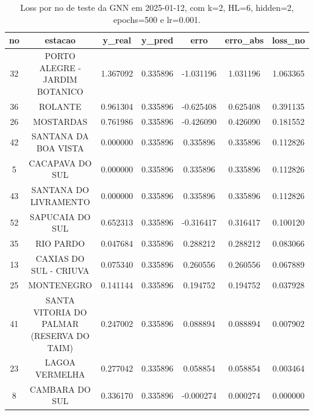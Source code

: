 \begin{table}[h]
\centering
\caption{Loss por no de teste da GNN em 2025-01-12, com k=2, HL=6, hidden=2, epochs=500 e lr=0.001.}
\label{tab:gnn_loss_k2_hl6_h2_e500_d20250112}
\begin{tabular}{ccccccc}
\toprule
no & estacao & y\_real & y\_pred & erro & erro\_abs & loss\_no \\
\midrule
32 & PORTO ALEGRE - JARDIM BOTANICO & 1.367092 & 0.335896 & -1.031196 & 1.031196 & 1.063365 \\
36 & ROLANTE & 0.961304 & 0.335896 & -0.625408 & 0.625408 & 0.391135 \\
26 & MOSTARDAS & 0.761986 & 0.335896 & -0.426090 & 0.426090 & 0.181552 \\
42 & SANTANA DA BOA VISTA & 0.000000 & 0.335896 & 0.335896 & 0.335896 & 0.112826 \\
5 & CACAPAVA DO SUL & 0.000000 & 0.335896 & 0.335896 & 0.335896 & 0.112826 \\
43 & SANTANA DO LIVRAMENTO & 0.000000 & 0.335896 & 0.335896 & 0.335896 & 0.112826 \\
52 & SAPUCAIA DO SUL & 0.652313 & 0.335896 & -0.316417 & 0.316417 & 0.100120 \\
35 & RIO PARDO & 0.047684 & 0.335896 & 0.288212 & 0.288212 & 0.083066 \\
13 & CAXIAS DO SUL - CRIUVA & 0.075340 & 0.335896 & 0.260556 & 0.260556 & 0.067889 \\
25 & MONTENEGRO & 0.141144 & 0.335896 & 0.194752 & 0.194752 & 0.037928 \\
41 & SANTA VITORIA DO PALMAR (RESERVA DO TAIM) & 0.247002 & 0.335896 & 0.088894 & 0.088894 & 0.007902 \\
23 & LAGOA VERMELHA & 0.277042 & 0.335896 & 0.058854 & 0.058854 & 0.003464 \\
8 & CAMBARA DO SUL & 0.336170 & 0.335896 & -0.000274 & 0.000274 & 0.000000 \\
\bottomrule
\end{tabular}
\end{table}
